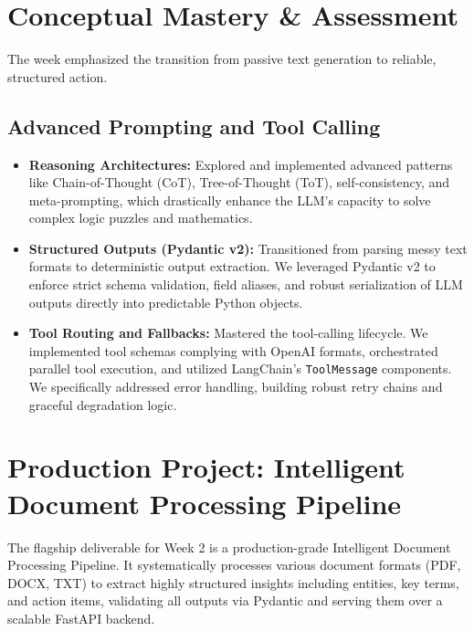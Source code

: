 \documentclass[12pt, a4paper]{article}
\begin{document}
\section{Conceptual Mastery \& Assessment}
The week emphasized the transition from passive text generation to reliable, structured action.

\subsection{Advanced Prompting and Tool Calling}
\begin{itemize}[label=\textcolor{secondary}{$\bullet$}]
    \item \textbf{Reasoning Architectures:} Explored and implemented advanced patterns like Chain-of-Thought (CoT), Tree-of-Thought (ToT), self-consistency, and meta-prompting, which drastically enhance the LLM's capacity to solve complex logic puzzles and mathematics.
    \item \textbf{Structured Outputs (Pydantic v2):} Transitioned from parsing messy text formats to deterministic output extraction. We leveraged Pydantic v2 to enforce strict schema validation, field aliases, and robust serialization of LLM outputs directly into predictable Python objects.
    \item \textbf{Tool Routing and Fallbacks:} Mastered the tool-calling lifecycle. We implemented tool schemas complying with OpenAI formats, orchestrated parallel tool execution, and utilized LangChain's \texttt{ToolMessage} components. We specifically addressed error handling, building robust retry chains and graceful degradation logic.
\end{itemize}

\newpage

\section{Production Project: Intelligent Document Processing Pipeline}

\begin{tcolorbox}[colback=accent, colframe=primary, title=\textbf{Architectural Overview}, boxrule=1pt]
The flagship deliverable for Week 2 is a production-grade Intelligent Document Processing Pipeline. It systematically processes various document formats (PDF, DOCX, TXT) to extract highly structured insights including entities, key terms, and action items, validating all outputs via Pydantic and serving them over a scalable FastAPI backend.
\end{tcolorbox}
\end{document}
